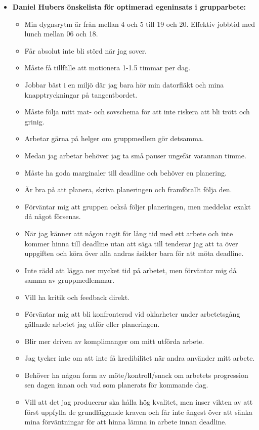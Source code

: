 \documentclass{mall}
\begin{document}
\begin{itemize}
\item \textbf{Daniel Hubers önskelista för optimerad egeninsats i grupparbete:}

  \begin{itemize}
  \item Min dygnsrytm är från mellan 4 och 5 till 19 och 20. Effektiv jobbtid med lunch mellan 06 och 18.
  \item Får absolut inte bli störd när jag sover.
  \item Måste få tillfälle att motionera 1-1.5 timmar per dag.
  \item Jobbar bäst i en miljö där jag bara hör min datorfläkt och mina knapptryckningar på tangentbordet.
  \item Måste följa mitt mat- och sovschema för att inte riskera att bli trött och grinig.
  \item Arbetar gärna på helger om gruppmedlem gör detsamma. 
  \item Medan jag arbetar behöver jag ta små pauser ungefär varannan timme.
  \item Måste ha goda marginaler till deadline och behöver en planering.
  \item Är bra på att planera, skriva planeringen och framförallt följa den.
  \item Förväntar mig att gruppen också följer planeringen, men meddelar exakt då något försenas.
  \item När jag känner att någon tagit för lång tid med ett arbete och inte kommer hinna till deadline utan att säga till tenderar jag att ta över uppgiften och köra över alla andras åsikter bara för att möta deadline.
  \item Inte rädd att lägga ner mycket tid på arbetet, men förväntar mig då samma av gruppmedlemmar.
  \item Vill ha kritik och feedback direkt.
  \item Förväntar mig att bli konfronterad vid oklarheter under arbetetsgång gällande arbetet jag utför eller planeringen.
  \item Blir mer driven av komplimanger om mitt utförda arbete.
  \item Jag tycker inte om att inte få kredibilitet när andra använder mitt arbete.
  \item Behöver ha någon form av möte/kontroll/snack om arbetets progression sen dagen innan och vad som planerats för kommande dag. 
  \item Vill att det jag producerar ska hålla hög kvalitet, men inser vikten av att först uppfylla de grundläggande kraven och får inte ångest över att sänka mina förväntningar för att hinna lämna in arbete innan deadline. 

\end{itemize}
\end{itemize}
\end{document}

